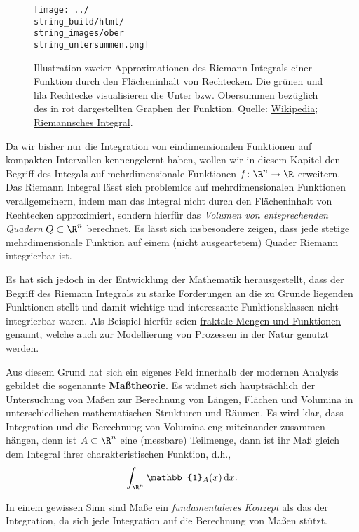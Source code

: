 \documentclass[letterpaper,10pt,german]{jupyterBook}
\begin{document}
\begin{figure}[htbp]
\centering


\noindent\texttt{[image: ../\\string\_build/html/\\string\_images/ober\\string\_untersummen.png]}
\caption{Illustration zweier Approximationen des Riemann Integrals einer Funktion durch den Flächeninhalt von Rechtecken. Die grünen und lila Rechtecke visualisieren die Unter  bzw. Obersummen bezüglich des in rot dargestellten Graphen der Funktion. Quelle: \href{https://de.wikipedia.org/wiki/Riemannsches\_Integral}{Wikipedia; Riemannsches Integral}.}\label{\detokenize{masstheorie/intro_masstheorie:fig-riemann-integral}}\end{figure}

\par
Da wir bisher nur die Integration von eindimensionalen Funktionen auf kompakten Intervallen kennengelernt haben, wollen wir in diesem Kapitel den Begriff des Integals auf mehrdimensionale Funktionen \(f \colon \R^n \rightarrow \R\) erweitern.
Das Riemann Integral lässt sich problemlos auf mehrdimensionalen Funktionen verallgemeinern, indem man das Integral nicht durch den Flächeninhalt von Rechtecken approximiert, sondern hierfür das \emph{Volumen von entsprechenden Quadern} \(Q \subset \R^n\) berechnet.
Es lässt sich insbesondere zeigen, dass jede stetige mehrdimensionale Funktion auf einem (nicht ausgeartetem) Quader Riemann integrierbar ist.

\par
Es hat sich jedoch in der Entwicklung der Mathematik herausgestellt, dass der Begriff des Riemann Integrals zu starke Forderungen an die zu Grunde liegenden Funktionen stellt und damit wichtige und interessante Funktionsklassen nicht integrierbar waren.
Als Beispiel hierfür seien \href{https://de.wikipedia.org/wiki/Fraktal}{fraktale Mengen und Funktionen} genannt, welche auch zur Modellierung von Prozessen in der Natur genutzt werden.

\par
Aus diesem Grund hat sich ein eigenes Feld innerhalb der modernen Analysis gebildet   die sogenannte \textbf{Maßtheorie}.
Es widmet sich hauptsächlich der Untersuchung von Maßen zur Berechnung von Längen, Flächen und Volumina in unterschiedlichen mathematischen Strukturen und Räumen.
Es wird klar, dass Integration und die Berechnung von Volumina eng miteinander zusammen hängen, denn ist \(A\subset\R^n\) eine (messbare) Teilmenge, dann ist ihr Maß gleich dem Integral ihrer charakteristischen Funktion, d.h.,
\begin{align*}
\int_{\R^n} \mathbb{1}_A(x)\,\mathrm{d}x.
\end{align*}
\par
In einem gewissen Sinn sind Maße ein \emph{fundamentaleres Konzept} als das der Integration, da sich jede Integration auf die Berechnung von Maßen stützt.
\end{document}
